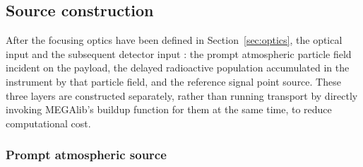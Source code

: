 \documentclass[11pt]{article}
\begin{document}
\subsection{Source construction}
\label{sec:background}

After the focusing optics have been defined in Section~\ref{sec:optics}, the
optical input and the subsequent detector input : the
prompt atmospheric particle field incident on the payload, the delayed
radioactive population accumulated in the instrument by that particle field, and
the reference signal point source. These three layers are constructed
separately, rather than running transport by directly invoking MEGAlib's buildup
function for them at the same time, to reduce computational cost.

\subsubsection{Prompt atmospheric source}
\label{subsec:prompt_source}
\end{document}
